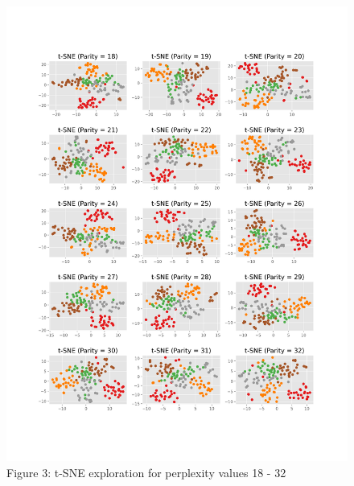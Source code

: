 \documentclass[12pt,article]{article}
\begin{document}
\begin{figure}[H]
\centering
\includegraphics[scale = 0.55]{images/sne_exploration2.png}    
\captionsetup{labelformat=empty}
\vspace{-75pt}
\caption{\scriptsize{Figure 3: t-SNE exploration for perplexity values 18 - 32}}
\end{figure}

\newpage
\end{document}
